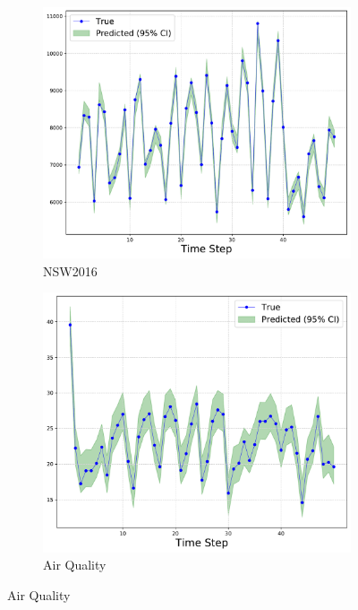 \documentclass[letterpaper]{article} %
\begin{document}
\begin{figure}[t]
	\centering
	\begin{subfigure}[b]{0.24\textwidth}
	        \centering
			\includegraphics[width=\linewidth, keepaspectratio=true]{nsw2013.pdf}
		\caption{NSW2016}
	    \label{fig:nsw}
    \end{subfigure}
    \begin{subfigure}[b]{0.235\textwidth}
	        \centering
			\includegraphics[width=\linewidth, keepaspectratio=true]{pollution.pdf}
		\caption{Air Quality}
	    \label{fig:pollution}

\end{subfigure}
\end{figure}
\end{document}
